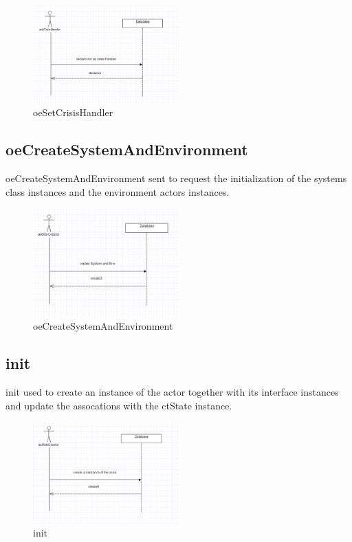 \begin{figure}[H]
\begin{center}
\includegraphics[width=0.5\textwidth]{./images/oeSetCrisisHandler.eps} 
\end{center}
\caption{oeSetCrisisHandler}
\end{figure}

\subsection{oeCreateSystemAndEnvironment}
oeCreateSystemAndEnvironment sent to request the initialization of the systems
class instances and the environment actors instances.

\begin{figure}[H]
\begin{center}
\includegraphics[width=0.5\textwidth]{./images/oeCreateSystemAndEnvironment.eps} 
\end{center}
\caption{oeCreateSystemAndEnvironment}
\end{figure}

\subsection{init}
init used to create an instance of the actor together with its interface
instances and update the assocations with the ctState instance.

\begin{figure}[H]
\begin{center}
\includegraphics[width=0.5\textwidth]{./images/init.eps} 
\end{center}
\caption{init}
\end{figure}




